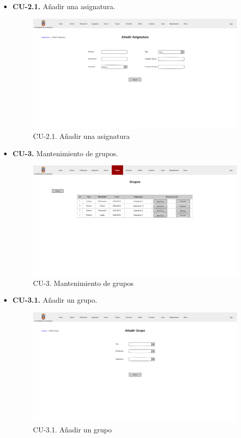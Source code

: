 \begin{itemize}
	\item \textbf{CU-2.1.} Añadir una asignatura.
	\begin{figure}[!h]
		\centering
		\includegraphics[width=\textwidth]{../img/Anexos/Vistas/add_asignatura.png}
		\caption{CU-2.1. Añadir una asignatura}\label{fig:../img/Anexos/Vistas/add_asignatura.png}
	\end{figure}
	
	\item \textbf{CU-3.} Mantenimiento de grupos.
	\begin{figure}[!h]
		\centering
		\includegraphics[width=\textwidth]{../img/Anexos/Vistas/grupos.png}
		\caption{CU-3. Mantenimiento de grupos}\label{fig:../img/Anexos/Vistas/grupos.png}
	\end{figure}
	
	\item \textbf{CU-3.1.} Añadir un grupo.
	\begin{figure}[!h]
		\centering
		\includegraphics[width=\textwidth]{../img/Anexos/Vistas/add_grupo.png}
		\caption{CU-3.1. Añadir un grupo}\label{fig:../img/Anexos/Vistas/add_grupo.png}
	\end{figure}
	

\end{itemize}
